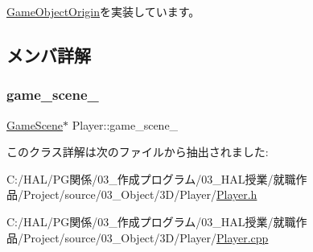 \mbox{\hyperlink{class_game_object_origin_aeac8fc4a1f625982313a9a60dd35d016}{Game\+Object\+Origin}}を実装しています。



\subsection{メンバ詳解}
\mbox{\label{class_player_ab41e7ebf6f975f2eea365923bc2dca7f}} 
\subsubsection{\texorpdfstring{game\+\_\+scene\+\_\+}{game\_scene\_}}
{\footnotesize\ttfamily \mbox{\hyperlink{class_game_scene}{Game\+Scene}}$\ast$ Player\+::game\+\_\+scene\+\_\+}



このクラス詳解は次のファイルから抽出されました\+:\begin{DoxyCompactItemize}
\item 
C\+:/\+H\+A\+L/\+P\+G関係/03\+\_\+作成プログラム/03\+\_\+\+H\+A\+L授業/就職作品/\+Project/source/03\+\_\+\+Object/3\+D/\+Player/\mbox{\hyperlink{_player_8h}{Player.\+h}}\item 
C\+:/\+H\+A\+L/\+P\+G関係/03\+\_\+作成プログラム/03\+\_\+\+H\+A\+L授業/就職作品/\+Project/source/03\+\_\+\+Object/3\+D/\+Player/\mbox{\hyperlink{_player_8cpp}{Player.\+cpp}}\end{DoxyCompactItemize}
